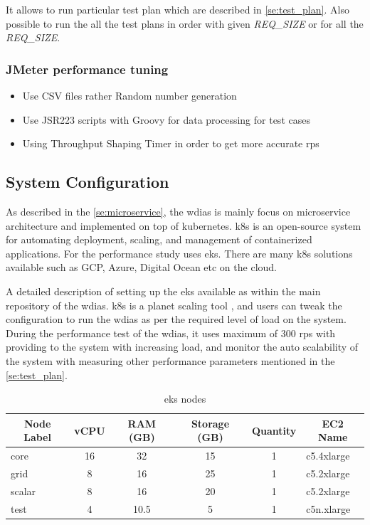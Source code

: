 It allows to run particular test plan which are described in \ref{se:test_plan}. Also possible to run the all the test plans in order with given \emph{REQ\_SIZE} or for all the \emph{REQ\_SIZE}.

\subsubsection{JMeter performance tuning}
\begin{itemize}
    \item Use CSV files rather Random number generation
    \item Use JSR223 scripts with Groovy for data processing for test cases
    \item Using Throughput Shaping Timer in order to get more accurate \acrshort{rps}
\end{itemize}


\subsection{System Configuration}
\label{subse:test_sys_config}
As described in the \ref{se:microservice}, the \acrshort{wdias} is mainly focus on microservice architecture and implemented on top of kubernetes. \acrfull{k8s} is an open-source system for automating deployment, scaling, and management of containerized applications. For the performance study uses \acrfull{eks}. There are many \acrshort{k8s} solutions available such as GCP, Azure, Digital Ocean etc on the cloud.

A detailed description of setting up the \acrshort{eks} available as \cite{KarunarathneWdias/Amazon_EKS.md:EKS} within the main repository of the \acrshort{wdias}.
\acrshort{k8s} is a planet scaling tool \cite{LinuxFoundationProduction-GradeKubernetes}, and users can tweak the configuration to run the \acrshort{wdias} as per the required level of load on the system. During the performance test of the \acrshort{wdias}, it uses maximum of 300 \acrshort{rps} with providing to the system with increasing load, and monitor the auto scalability of the system with measuring other performance parameters mentioned in the \ref{se:test_plan}.

\begin{table}[ht]
\caption{\acrshort{eks} nodes}
\footnotesize
\begin{tabular}{lccccl}
\hline
\multicolumn{1}{c}{\textbf{Node Label}} & \textbf{vCPU} & \textbf{RAM (GB)} & \textbf{Storage (GB)} & \textbf{Quantity} & \multicolumn{1}{c}{\textbf{EC2 Name}} \\ \hline
core & 16 & 32 & 15 & 1 & c5.4xlarge \\
grid & 8 & 16 & 25 & 1 & c5.2xlarge \\
scalar & 8 & 16 & 20 & 1 & c5.2xlarge \\
test & 4 & 10.5 & 5 & 1 & c5n.xlarge \\ \hline
\end{tabular}
\label{tab:aws_eks_nodes}
\end{table}

